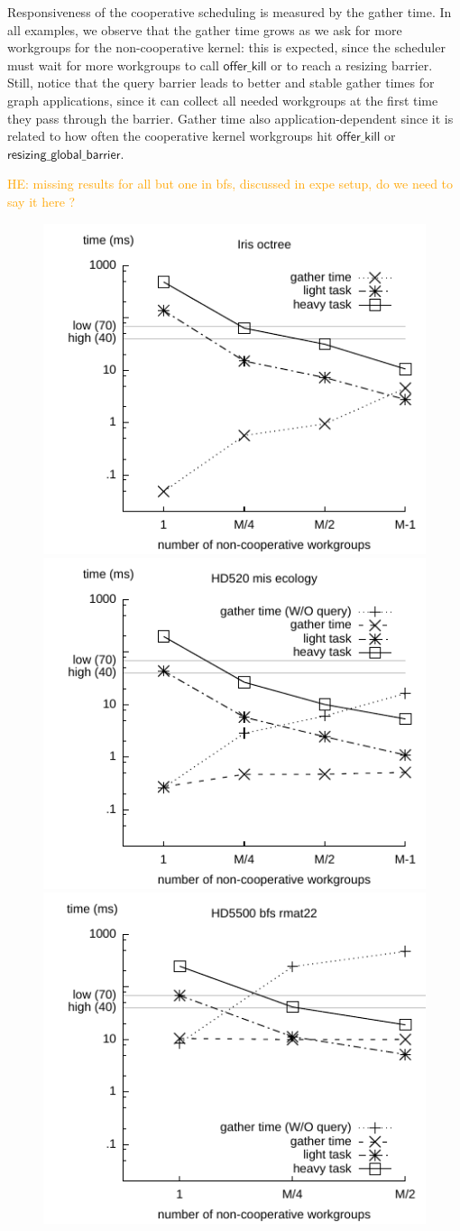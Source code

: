 \documentclass[numbers,nocopyrightspace,10pt]{sigplanconf}
\newcommand{\HEComment}[1]{\textcolor{orange}{HE: #1}}
\newcommand{\offerkill}{\mathsf{offer\_kill}}
\newcommand{\resizingglobalbarrier}{\mathsf{resizing\_global\_barrier}}
\begin{document}
Responsiveness of the cooperative scheduling is measured by the gather
time. In all examples, we observe that the gather time grows as we ask
for more workgroups for the non-cooperative kernel: this is expected,
since the scheduler must wait for more workgroups to call $\offerkill$
or to reach a resizing barrier. Still, notice that the query barrier
leads to better and stable gather times for graph applications, since it
can collect all needed workgroups at the first time they pass through
the barrier. Gather time also application-dependent since it is related
to how often the cooperative kernel workgroups hit $\offerkill$ or
$\resizingglobalbarrier$.

\HEComment{missing results for all but one in bfs, discussed in expe
setup, do we need to say it here ?}

\begin{figure}
\includegraphics[width=.7\columnwidth]{iris_octree_NA.pdf} 
\includegraphics[width=.7\columnwidth]{hd520_mis_ecology.pdf}
\includegraphics[width=.7\columnwidth]{hd5500_bfs_rmat22.pdf}

\end{figure}
\end{document}
